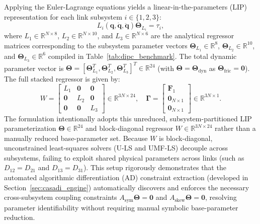 \documentclass[lettersize,journal]{IEEEtran}
\begin{document}
Applying the Euler-Lagrange equations yields a linear-in-the-parameters (LIP) representation for each link subsystem $i \in \{1, 2, 3\}$:
\begin{equation}
    L_i(\bm{q}, \dot{\bm{q}}, \ddot{\bm{q}}) \bm{\Theta}_{L_i} = \tau_i,
    \label{eq:dipc_link_reg}
\end{equation}
where $L_1 \in \mathbb{R}^{N \times 8}$, $L_2 \in \mathbb{R}^{N \times 10}$, and $L_3 \in \mathbb{R}^{N \times 6}$ are the analytical regressor matrices corresponding to the subsystem parameter vectors $\bm{\Theta}_{L_1} \in \mathbb{R}^8$, $\bm{\Theta}_{L_2} \in \mathbb{R}^{10}$, and $\bm{\Theta}_{L_3} \in \mathbb{R}^{6}$ compiled in Table~\ref{tab:dipc_benchmark}. The total dynamic parameter vector is $\bm{\Theta} = [\bm{\Theta}_{L_1}^T, \bm{\Theta}_{L_2}^T, \bm{\Theta}_{L_3}^T]^T \in \mathbb{R}^{24}$ (with $\bm{\Theta} = \bm{\Theta}_{\text{dyn}}$ as $\bm{\Theta}_{\text{fric}} = \mathbf{0}$). The full stacked regressor is given by:
\begin{equation}
    W = \begin{bmatrix} L_1 & \mathbf{0} & \mathbf{0} \\ \mathbf{0} & L_2 & \mathbf{0} \\ \mathbf{0} & \mathbf{0} & L_3 \end{bmatrix} \in \mathbb{R}^{3N \times 24}, \quad \bm{\Gamma} = \begin{bmatrix} \bm{F}_1 \\ \mathbf{0}_{N \times 1} \\ \mathbf{0}_{N \times 1} \end{bmatrix} \in \mathbb{R}^{3N \times 1}.
    \label{eq:dipc_stacked}
\end{equation}
The formulation intentionally adopts this unreduced, subsystem-partitioned LIP parameterization $\bm{\Theta} \in \mathbb{R}^{24}$ and block-diagonal regressor $W \in \mathbb{R}^{3N \times 24}$ rather than a manually reduced base-parameter set. Because $W$ is block-diagonal, unconstrained least-squares solvers (U-LS and UMF-LS) decouple across subsystems, failing to exploit shared physical parameters across links (such as $D_{12}=D_{21}$ and $D_{13}=D_{31}$). This setup rigorously demonstrates that the automated algorithmic differentiation (AD) constraint extraction (developed in Section~\ref{sec:casadi_engine}) automatically discovers and enforces the necessary cross-subsystem coupling constraints $A_{\mathrm{sym}}\bm{\Theta}=\mathbf{0}$ and $A_{\mathrm{skew}}\bm{\Theta}=\mathbf{0}$, resolving parameter identifiability without requiring manual symbolic base-parameter reduction.
\end{document}
